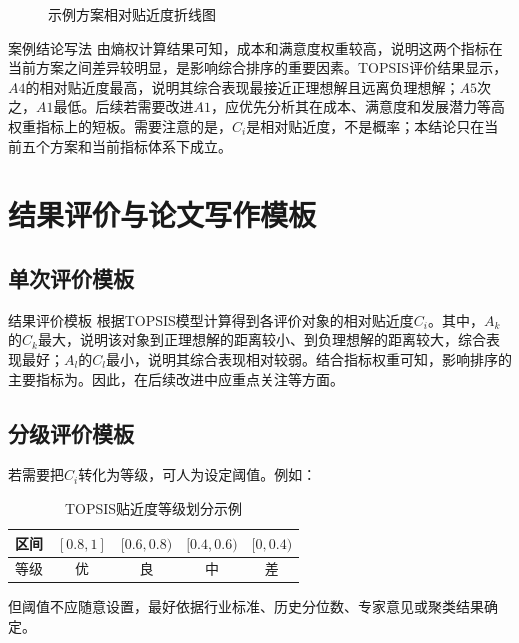 \documentclass[UTF8,a4paper,12pt,fontset=none]{ctexart}
\begin{document}
\begin{figure}[H]
\centering
{}
\caption{示例方案相对贴近度折线图}
\end{figure}

\begin{paperbox}{案例结论写法}
由熵权计算结果可知，成本和满意度权重较高，说明这两个指标在当前方案之间差异较明显，是影响综合排序的重要因素。TOPSIS评价结果显示，$A4$的相对贴近度最高，说明其综合表现最接近正理想解且远离负理想解；$A5$次之，$A1$最低。后续若需要改进$A1$，应优先分析其在成本、满意度和发展潜力等高权重指标上的短板。需要注意的是，$C_i$是相对贴近度，不是概率；本结论只在当前五个方案和当前指标体系下成立。
\end{paperbox}

\section{结果评价与论文写作模板}

\subsection{单次评价模板}
\begin{paperbox}{结果评价模板}
根据TOPSIS模型计算得到各评价对象的相对贴近度$C_i$。其中，$A_k$的$C_k$最大，说明该对象到正理想解的距离较小、到负理想解的距离较大，综合表现最好；$A_l$的$C_l$最小，说明其综合表现相对较弱。结合指标权重可知，影响排序的主要指标为\underline{\hspace{3cm}}。因此，在后续改进中应重点关注\underline{\hspace{3cm}}等方面。
\end{paperbox}

\subsection{分级评价模板}
若需要把$C_i$转化为等级，可人为设定阈值。例如：
\begin{table}[H]
\centering
\caption{TOPSIS贴近度等级划分示例}
\begin{tabular}{ccccc}
\toprule
区间 & $[0.8,1]$ & $[0.6,0.8)$ & $[0.4,0.6)$ & $[0,0.4)$\\
\midrule
等级 & 优 & 良 & 中 & 差\\
\bottomrule
\end{tabular}
\end{table}
但阈值不应随意设置，最好依据行业标准、历史分位数、专家意见或聚类结果确定。
\end{document}
